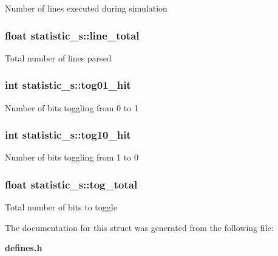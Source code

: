 Number of lines executed during simulation 
\subsubsection{\setlength{\rightskip}{0pt plus 5cm}float statistic\_\-s::line\_\-total}\label{structstatistic__s_m0}


Total number of lines parsed 
\subsubsection{\setlength{\rightskip}{0pt plus 5cm}int statistic\_\-s::tog01\_\-hit}\label{structstatistic__s_m3}


Number of bits toggling from 0 to 1 
\subsubsection{\setlength{\rightskip}{0pt plus 5cm}int statistic\_\-s::tog10\_\-hit}\label{structstatistic__s_m4}


Number of bits toggling from 1 to 0 
\subsubsection{\setlength{\rightskip}{0pt plus 5cm}float statistic\_\-s::tog\_\-total}\label{structstatistic__s_m2}


Total number of bits to toggle 

The documentation for this struct was generated from the following file:\begin{CompactItemize}
\item 
{\bf defines.h}\end{CompactItemize}
